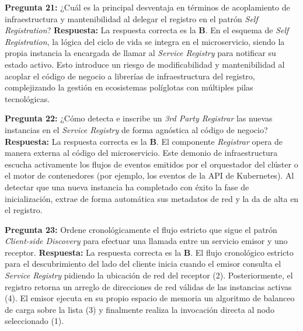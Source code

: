 \noindent\textbf{Pregunta 21:} ¿Cuál es la principal desventaja en términos de acoplamiento de infraestructura y mantenibilidad al delegar el registro en el patrón \textit{Self Registration}?
\newline
\textbf{Respuesta:} La respuesta correcta es la \textbf{B}. En el esquema de \textit{Self Registration}, la lógica del ciclo de vida se integra en el microservicio, siendo la propia instancia la encargada de llamar al \textit{Service Registry} para notificar su estado activo. Esto introduce un riesgo de modificabilidad y mantenibilidad al acoplar el código de negocio a librerías de infraestructura del registro, complejizando la gestión en ecosistemas políglotas con múltiples pilas tecnológicas.

\vspace{4mm}

\noindent\textbf{Pregunta 22:} ¿Cómo detecta e inscribe un \textit{3rd Party Registrar} las nuevas instancias en el \textit{Service Registry} de forma agnóstica al código de negocio?
\newline
\textbf{Respuesta:} La respuesta correcta es la \textbf{B}. El componente \textit{Registrar} opera de manera externa al código del microservicio. Este demonio de infraestructura escucha activamente los flujos de eventos emitidos por el orquestador del clúster o el motor de contenedores (por ejemplo, los eventos de la API de Kubernetes). Al detectar que una nueva instancia ha completado con éxito la fase de inicialización, extrae de forma automática sus metadatos de red y la da de alta en el registro.

\vspace{4mm}

\noindent\textbf{Pregunta 23:} Ordene cronológicamente el flujo estricto que sigue el patrón \textit{Client-side Discovery} para efectuar una llamada entre un servicio emisor y uno receptor.
\newline
\textbf{Respuesta:} La respuesta correcta es la \textbf{B}. El flujo cronológico estricto para el descubrimiento del lado del cliente inicia cuando el emisor consulta el \textit{Service Registry} pidiendo la ubicación de red del receptor (2). Posteriormente, el registro retorna un arreglo de direcciones de red válidas de las instancias activas (4). El emisor ejecuta en su propio espacio de memoria un algoritmo de balanceo de carga sobre la lista (3) y finalmente realiza la invocación directa al nodo seleccionado (1).

\vspace{4mm}

